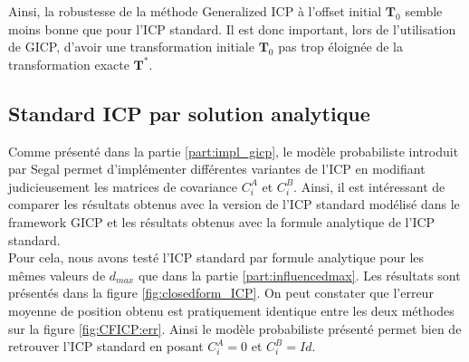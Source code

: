 Ainsi, la robustesse de la méthode Generalized ICP à l'offset initial $\mathbf{T}_0$ semble moins bonne que pour l'ICP standard. Il est donc important, lors de l'utilisation de GICP, d'avoir une transformation initiale $\mathbf{T}_0$ pas trop éloignée de la transformation exacte $\mathbf{T}^*$.

\subsection{Standard ICP par solution analytique}

Comme présenté dans la partie \ref{part:impl_gicp}, le modèle probabiliste introduit par Segal permet d'implémenter différentes variantes de l'ICP en modifiant judicieusement les matrices de covariance $C_{i}^A$ et $C_{i}^B$. Ainsi, il est intéressant de comparer les résultats obtenus avec la version de l'ICP standard modélisé dans le framework GICP et les résultats obtenus avec la formule analytique de l'ICP standard. \\

Pour cela, nous avons testé l'ICP standard par formule analytique pour les mêmes valeurs de $d_{max}$ que dans la partie \ref{part:influencedmax}. Les résultats sont présentés dans la figure \ref{fig:closedform_ICP}. On peut constater que l'erreur moyenne de position obtenu est pratiquement identique entre les deux méthodes sur la figure \ref{fig:CFICP:err}. Ainsi le modèle probabiliste présenté permet bien de retrouver l'ICP standard en posant  $C_{i}^A = 0$ et $C_{i}^B = Id$.\\

